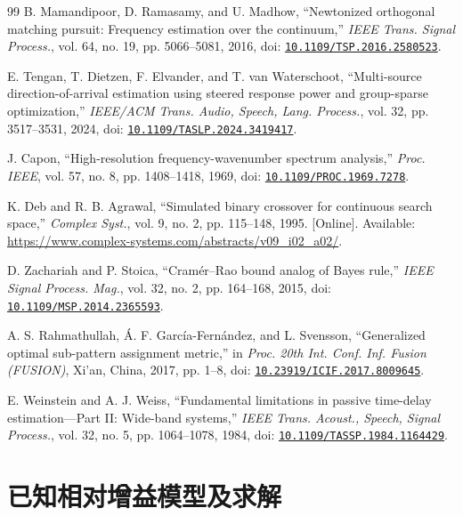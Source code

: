 \documentclass[11pt,a4paper]{article}
\numberwithin{equation}{section}
\numberwithin{figure}{section}
\numberwithin{table}{section}
\begin{document}
\begin{thebibliography}{99}
B. Mamandipoor, D. Ramasamy, and U. Madhow, ``Newtonized orthogonal matching pursuit: Frequency estimation over the continuum,'' \emph{IEEE Trans. Signal Process.}, vol. 64, no. 19, pp. 5066--5081, 2016, doi: \href{https://doi.org/10.1109/TSP.2016.2580523}{\nolinkurl{10.1109/TSP.2016.2580523}}.

E. Tengan, T. Dietzen, F. Elvander, and T. van Waterschoot, ``Multi-source direction-of-arrival estimation using steered response power and group-sparse optimization,'' \emph{IEEE/ACM Trans. Audio, Speech, Lang. Process.}, vol. 32, pp. 3517--3531, 2024, doi: \href{https://doi.org/10.1109/TASLP.2024.3419417}{\nolinkurl{10.1109/TASLP.2024.3419417}}.

J. Capon, ``High-resolution frequency-wavenumber spectrum analysis,'' \emph{Proc. IEEE}, vol. 57, no. 8, pp. 1408--1418, 1969, doi: \href{https://doi.org/10.1109/PROC.1969.7278}{\nolinkurl{10.1109/PROC.1969.7278}}.

K. Deb and R. B. Agrawal, ``Simulated binary crossover for continuous search space,'' \emph{Complex Syst.}, vol. 9, no. 2, pp. 115--148, 1995. [Online]. Available: \url{https://www.complex-systems.com/abstracts/v09_i02_a02/}.

D. Zachariah and P. Stoica, ``Cramér--Rao bound analog of Bayes rule,'' \emph{IEEE Signal Process. Mag.}, vol. 32, no. 2, pp. 164--168, 2015, doi: \href{https://doi.org/10.1109/MSP.2014.2365593}{\nolinkurl{10.1109/MSP.2014.2365593}}.

A. S. Rahmathullah, Á. F. García-Fernández, and L. Svensson, ``Generalized optimal sub-pattern assignment metric,'' in \emph{Proc. 20th Int. Conf. Inf. Fusion (FUSION)}, Xi'an, China, 2017, pp. 1--8, doi: \href{https://doi.org/10.23919/ICIF.2017.8009645}{\nolinkurl{10.23919/ICIF.2017.8009645}}.

E. Weinstein and A. J. Weiss, ``Fundamental limitations in passive time-delay estimation---Part II: Wide-band systems,'' \emph{IEEE Trans. Acoust., Speech, Signal Process.}, vol. 32, no. 5, pp. 1064--1078, 1984, doi: \href{https://doi.org/10.1109/TASSP.1984.1164429}{\nolinkurl{10.1109/TASSP.1984.1164429}}.
\end{thebibliography}

\clearpage
\appendix
\section{已知相对增益模型及求解}\label{sec:2}
\end{document}
